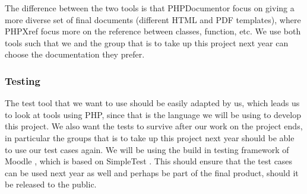 The difference between the two tools is that PHPDocumentor focus on giving a more diverse set of final documents (different HTML and PDF templates), where PHPXref focus more on the reference between classes, function, etc.
We use both tools such that we and the group that is to take up this project next year can choose the documentation they prefer.


\subsubsection{Testing}
The test tool that we want to use should be easily adapted by us, which leads us to look at tools using PHP, since that is the language we will be using to develop this project.
We also want the tests to survive after our work on the project ends, in particular the groups that is to take up this project next year should be able to use our test cases again.
We will be using the build in testing framework of Moodle \cite{moodletest}, which is based on SimpleTest \cite{simpletest}.
This should ensure that the test cases can be used next year as well and perhaps be part of the final product, should it be released to the public.














